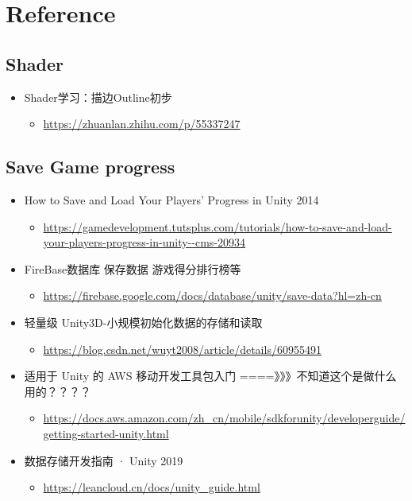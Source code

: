 \documentclass[9pt, b5paper]{article}
\begin{document}
\section{Reference}
\label{sec-2}
\subsection{Shader}
\label{sec-2-1}
\begin{itemize}
\item Shader学习：描边Outline初步
\begin{itemize}
\item \url{https://zhuanlan.zhihu.com/p/55337247}
\end{itemize}
\end{itemize}

\subsection{Save Game progress}
\label{sec-2-2}
\begin{itemize}
\item How to Save and Load Your Players' Progress in Unity 2014
\begin{itemize}
\item \url{https://gamedevelopment.tutsplus.com/tutorials/how-to-save-and-load-your-players-progress-in-unity--cms-20934}
\end{itemize}
\item FireBase数据库 保存数据 游戏得分排行榜等
\begin{itemize}
\item \url{https://firebase.google.com/docs/database/unity/save-data?hl=zh-cn}
\end{itemize}
\item 轻量级 Unity3D-小规模初始化数据的存储和读取
\begin{itemize}
\item \url{https://blog.csdn.net/wuyt2008/article/details/60955491}
\end{itemize}
\item 适用于 Unity 的 AWS 移动开发工具包入门  ====》》》不知道这个是做什么用的？？？？
\begin{itemize}
\item \url{https://docs.aws.amazon.com/zh_cn/mobile/sdkforunity/developerguide/getting-started-unity.html}
\end{itemize}
\item 数据存储开发指南 · Unity 2019
\begin{itemize}
\item \url{https://leancloud.cn/docs/unity_guide.html}
\end{itemize}
\end{itemize}
\end{document}
